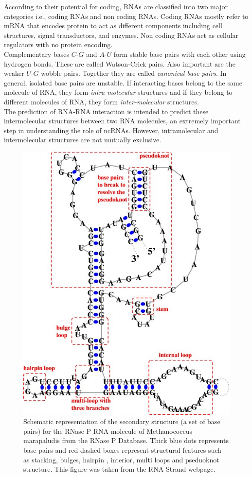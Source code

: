 \documentclass[twoside,a4paper]{report}
\numberwithin{equation}{section}
\begin{document}
	According to their potential for coding, RNAs are classified into two major categories i.e., coding RNAs and non coding RNAs. Coding RNAs mostly refer to mRNA that encodes protein to act as different components including cell structures, signal transductors, and enzymes. Non coding RNAs act as cellular regulators with no protein encoding.\\
	Complementary bases $C$-$G$ and $A$-$U$ form stable base pairs with each other using hydrogen bonds. These are called Watson-Crick pairs. Also important are the weaker $U$-$G$ wobble pairs. Together they are called \textit{canonical base pairs}. In general, isolated base pairs are unstable. If interacting bases belong to the same molecule of RNA, they form \textit{intra-molecular} structures and if they belong to different molecules of RNA, they form \textit{inter-molecular} structures.\\
	
	The prediction of RNA-RNA interaction is intended to predict these intermolecular structures between two RNA molecules, an extremely important step in understanding the role of ncRNAs. However, intramolecular and intermolecular structures are not mutually exclusive.\\
	
	\begin{figure}[h]
	\includegraphics[width=0.7\linewidth]{secondary_structure}
	\centering
	\caption{Schematic representation of the secondary structure (a set of base pairs) for the RNase P RNA molecule of Methanococcus marapaludis from the RNase P Database. Thick blue dots represents base pairs and red dashed boxes represent structural features such as stacking, bulges, hairpin , interior, multi loops and pseduoknot structure. This figure was taken from the RNA Strand webpage.
	\label{fig:secondarystructure} 
    \citep{andronescu2008rna}}
	\end{figure}
\end{document}
